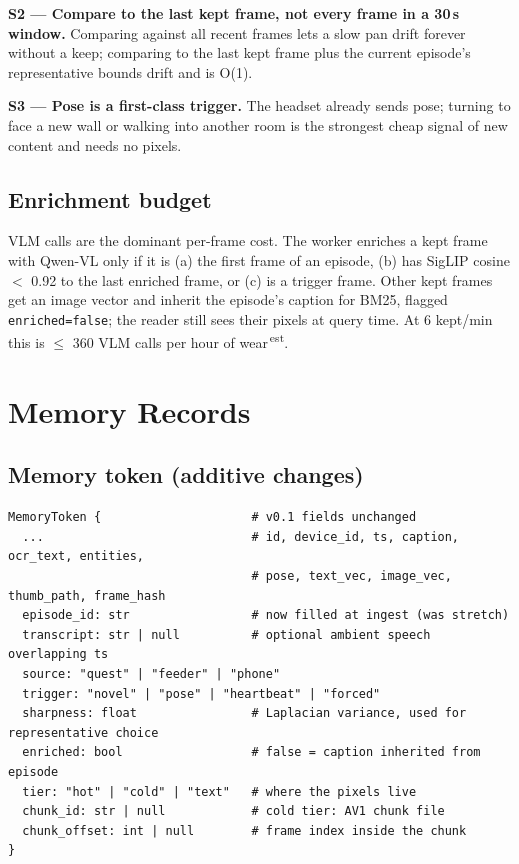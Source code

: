 \documentclass[11pt,a4paper]{article}
\newcommand{\est}{\textsuperscript{\color{mmorange}\,est}}
\begin{document}
\begin{decision}
\textbf{S2 --- Compare to the last kept frame, not every frame in a 30\,s window.} Comparing against all recent frames lets a slow pan drift forever without a keep; comparing to the last kept frame plus the current episode's representative bounds drift and is O(1).
\end{decision}

\begin{decision}
\textbf{S3 --- Pose is a first-class trigger.} The headset already sends pose; turning to face a new wall or walking into another room is the strongest cheap signal of new content and needs no pixels.
\end{decision}

\subsection{Enrichment budget}
VLM calls are the dominant per-frame cost. The worker enriches a kept frame with Qwen-VL only if it is (a) the first frame of an episode, (b) has SigLIP cosine $<$ 0.92 to the last enriched frame, or (c) is a trigger frame. Other kept frames get an image vector and inherit the episode's caption for BM25, flagged \texttt{enriched=false}; the reader still sees their pixels at query time.
\noindent At 6 kept/min this is $\le$ 360 VLM calls per hour of wear\est.

\section{Memory Records}
\subsection{Memory token (additive changes)}
\begin{lstlisting}
MemoryToken {                     # v0.1 fields unchanged
  ...                             # id, device_id, ts, caption, ocr_text, entities,
                                  # pose, text_vec, image_vec, thumb_path, frame_hash
  episode_id: str                 # now filled at ingest (was stretch)
  transcript: str | null          # optional ambient speech overlapping ts
  source: "quest" | "feeder" | "phone"
  trigger: "novel" | "pose" | "heartbeat" | "forced"
  sharpness: float                # Laplacian variance, used for representative choice
  enriched: bool                  # false = caption inherited from episode
  tier: "hot" | "cold" | "text"   # where the pixels live
  chunk_id: str | null            # cold tier: AV1 chunk file
  chunk_offset: int | null        # frame index inside the chunk
}
\end{lstlisting}
\end{document}
